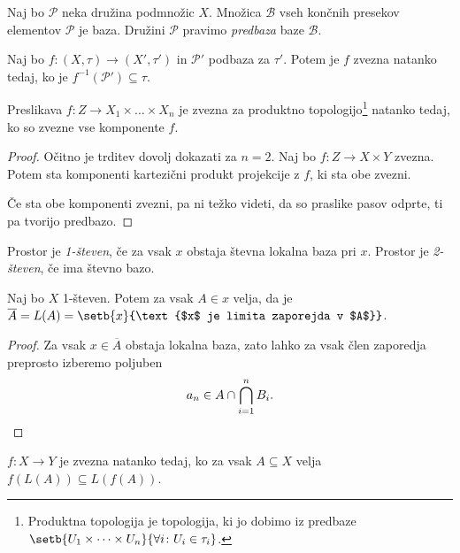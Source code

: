 \obvs

\begin{definicija}
Naj bo $\mathcal{P}$ neka družina podmnožic $X$. Množica
$\mathcal{B}$ vseh končnih presekov elementov $\mathcal{P}$ je
baza. Družini $\mathcal{P}$ pravimo
\emph{predbaza} baze $\mathcal{B}$.
\end{definicija}

\begin{trditev}
Naj bo $f \colon (X,\tau) \to (X',\tau')$ in $\mathcal{P}'$ podbaza
za $\tau'$. Potem je $f$ zvezna natanko tedaj, ko je
$f^{-1}(\mathcal{P}') \subseteq \tau$.
\end{trditev}

\obvs

\begin{trditev}
Preslikava $f \colon Z \to X_1 \times \dots \times X_n$ je zvezna
za produktno topologijo\footnote{Produktna topologija je
topologija, ki jo dobimo iz predbaze
$\setb{U_1 \times \dots \times U_n}
{\forall i \colon U_i \in \tau_i}$.}
natanko tedaj, ko so zvezne vse komponente
$f$.
\end{trditev}

\begin{proof}
Očitno je trditev dovolj dokazati za $n=2$. Naj bo
$f \colon Z \to X \times Y$ zvezna. Potem sta komponenti kartezični
produkt projekcije z $f$, ki sta obe zvezni.

Če sta obe komponenti zvezni, pa ni težko videti, da so praslike
pasov odprte, ti pa tvorijo predbazo.
\end{proof}

\begin{definicija}
Prostor je \emph{1-števen}, če
za vsak $x$ obstaja števna lokalna baza pri $x$. Prostor je
\emph{2-števen}, če ima števno bazo.
\end{definicija}

\begin{trditev}
Naj bo $X$ 1-števen. Potem za vsak $A \in x$ velja, da je 
$\overline{A} = L(A) =
\setb{x}{\text{$x$ je limita zaporejda v $A$}}$.
\end{trditev}

\begin{proof}
Za vsak $x \in \overline{A}$ obstaja lokalna baza, zato lahko za
vsak člen zaporedja preprosto izberemo poljuben
\[
a_n \in A \cap \bigcap_{i=1}^n B_i. \qedhere
\]
\end{proof}

\begin{trditev}
$f \colon X \to Y$ je zvezna natanko tedaj, ko za vsak
$A \subseteq X$ velja $f(L(A)) \subseteq L(f(A))$.
\end{trditev}
